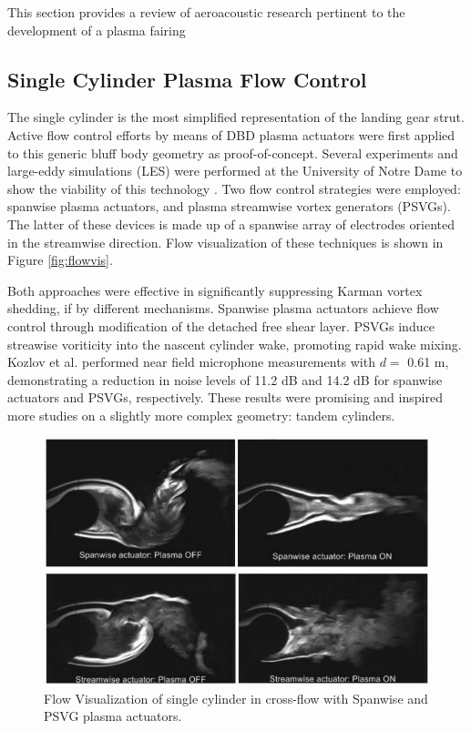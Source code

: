 This section provides a review of aeroacoustic research pertinent to the development of a plasma fairing 

\subsection{Single Cylinder Plasma Flow Control}

The single cylinder is the most simplified representation of the landing gear strut. Active flow control efforts by means of DBD plasma actuators were first applied to this generic bluff body geometry as proof-of-concept. Several experiments and large-eddy simulations (LES) were performed at the University of Notre Dame to show the viability of this technology \cite{kozlov2009}. Two flow control strategies were employed: spanwise plasma actuators, and plasma streamwise vortex generators (PSVGs). The latter of these devices is made up of a spanwise array of electrodes oriented in the streamwise direction. Flow visualization of these techniques is shown in Figure \ref{fig:flowvis}. 

Both approaches were effective in significantly suppressing Karman vortex shedding, if by different mechanisms. Spanwise plasma actuators achieve flow control through modification of the detached free shear layer. PSVGs induce streawise voriticity into the nascent cylinder wake, promoting rapid wake mixing. Kozlov et al. performed near field microphone measurements with $d=$ 0.61 m, demonstrating a reduction in noise levels of 11.2 dB and 14.2 dB for spanwise actuators and PSVGs, respectively. These results were promising and inspired more studies on a slightly more complex geometry: tandem cylinders.

\begin{figure}
	\begin{center}
		\centerline{\includegraphics[scale=1.0]{figures/single_span.pdf}}
		\centerline{\includegraphics[scale=1.0]{figures/single_psvg.pdf}}
		\caption{Flow Visualization of single cylinder in cross-flow with Spanwise and PSVG plasma actuators.}
		\label{fig:cyl1}
	\end{center}
\end{figure}



